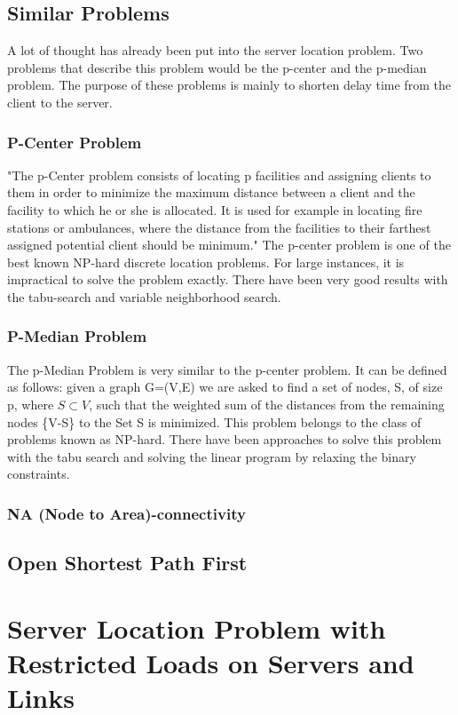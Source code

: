 \documentclass [12pt]{article}
\begin{document}
\subsection {Similar Problems}
A lot of thought has already been put into the server location problem.
Two problems that describe this problem would be the p-center and the
p-median problem. The purpose of these problems is mainly to shorten delay
time from the client to the server. 
\subsubsection {P-Center Problem}
"The p-Center problem consists of locating p facilities and assigning clients
to them in order to minimize the maximum distance between a client and the facility
to which he or she is allocated. It is used for example in locating fire stations or ambulances,
where the distance from the facilities 
to their farthest assigned potential client should be minimum."\cite{Mladenovic00solvingthe}
The p-center problem is one of the best known NP-hard discrete location problems.\cite{KarivHakimi1979}
For large instances, it is impractical to solve the problem exactly.
There have been very good results with the tabu-search and variable neighborhood search.
\cite{Mladenovic00solvingthe}
\subsubsection {P-Median Problem}
The p-Median Problem is very similar to the p-center problem. It can be defined as follows:
given a graph G=(V,E) we are asked to find a set of nodes, S, of size p, where $ S\subset V$, such that the weighted
sum of the distances from the remaining nodes \{V-S\} to the Set S is minimized. \cite{Rolland1997329}
This problem belongs to the class of problems known as NP-hard.\cite{KarivHakimi1979median} There have been
approaches to solve this problem with the tabu search \cite{Rolland1997329} and solving the linear program by
relaxing the binary constraints.\cite{rosing1979p}


\subsubsection {NA (Node to Area)-connectivity}
\subsection{Open Shortest Path First}
\section{Server Location Problem with Restricted Loads on Servers and Links}
\end{document}
